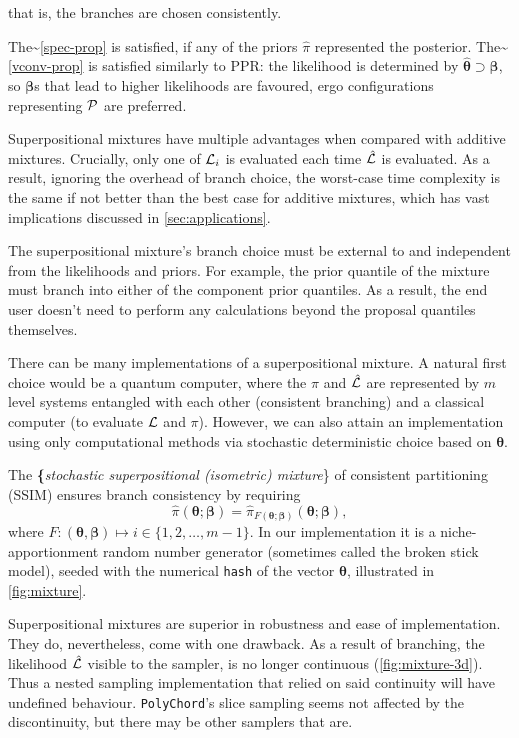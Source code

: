 \documentclass[draft,usenatbib]{mnras}
\begin{document}
that is, the branches are chosen consistently.

The\textasciitilde{}\cref{spec-prop} is satisfied, if any of the priors \(\hat{\pi}\)
represented the posterior. The\textasciitilde{}\cref{vconv-prop} is satisfied
similarly to PPR: the likelihood is determined by
\(\bm\hat{\theta} \supset \bm{\beta}\), so \(\bm{\beta}\)s that lead to
higher likelihoods are favoured, ergo configurations representing
\({\cal P}\) are preferred.

Superpositional mixtures have multiple advantages when compared with
additive mixtures. Crucially, only one of \({\cal L}_{i}\) is evaluated
each time \(\hat{\cal L}\) is evaluated. As a result, ignoring the
overhead of branch choice, the worst-case time complexity is the same
if not better than the best case for additive mixtures, which has vast
implications discussed in \cref{sec:applications}.

The superpositional mixture's branch choice must be external to and
independent from the likelihoods and priors. For example, the prior
quantile of the mixture must branch into either of the component prior
quantiles. As a result, the end user doesn't need to perform any
calculations beyond the proposal quantiles themselves.

There can be many implementations of a superpositional mixture. A
natural first choice would be a quantum computer, where the
\(\hat{\pi}\) and \(\hat{\cal L}\) are represented by \(m\) level systems
entangled with each other (consistent branching) and a classical
computer (to evaluate \({\cal L}\) and \(\pi\)). However, we can also
attain an implementation using only computational methods via
stochastic deterministic choice based on \(\bm{\theta}\).

The \textbf\{\emph{stochastic superpositional (isometric) mixture}\} of
consistent partitioning (SSIM) ensures branch consistency by requiring
\begin{equation}
\hat{\pi}(\bm{\theta}; \bm{\beta}) = \hat{\pi}_{F(\bm{\theta};
  \bm{\beta})}(\bm{\theta};\bm{\beta}),
  \end{equation}
where
\(F: (\bm{\theta}, \bm{\beta}) \mapsto i \in \{1, 2, \ldots, m-1\}\). In
our implementation it is a niche-apportionment random number generator
(sometimes called the broken stick model), seeded with the numerical
\texttt{hash} of the vector \(\bm{\theta}\), illustrated in
\cref{fig:mixture}.

Superpositional mixtures are superior in robustness and ease of
implementation. They do, nevertheless, come with one drawback. As a
result of branching, the likelihood \(\hat{\cal L}\) visible to the
sampler, is no longer continuous (\cref{fig:mixture-3d}). Thus a
nested sampling implementation that relied on said continuity will
have undefined behaviour. \texttt{PolyChord}'s slice sampling seems
not affected by the discontinuity, but there may be other samplers
that are.
\end{document}
